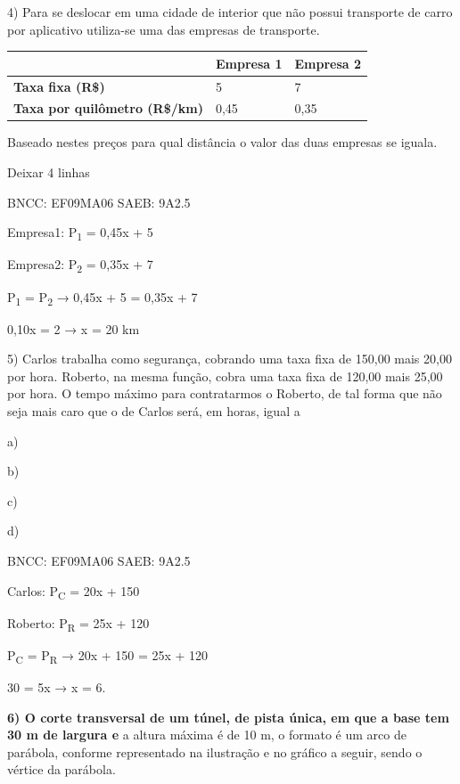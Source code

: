 \begin{escolha}
{{{\begin{escolha}
{4) Para se deslocar em uma cidade de interior que não possui transporte
de carro por aplicativo utiliza-se uma das empresas de transporte.

\begin{longtable}[]{@{}lll@{}}
\toprule\noalign{}
& \textbf{Empresa 1} & \textbf{Empresa 2} \\
\midrule\noalign{}
\endhead
\bottomrule\noalign{}
\endlastfoot
\textbf{Taxa fixa (R\$)} & 5 & 7 \\
\textbf{Taxa por quilômetro (R\$/km)} & 0,45 & 0,35 \\
\end{longtable}

Baseado nestes preços para qual distância o valor das duas empresas se
iguala.

Deixar 4 linhas

BNCC: EF09MA06 SAEB: 9A2.5

Empresa1: P\textsubscript{1} = 0,45x + 5

Empresa2: P\textsubscript{2} = 0,35x + 7

P\textsubscript{1} = P\textsubscript{2} → 0,45x + 5 = 0,35x + 7

0,10x = 2 → x = 20 km

5) Carlos trabalha como segurança, cobrando uma taxa fixa de 150,00 mais
20,00 por hora. Roberto, na mesma função, cobra uma taxa fixa de 120,00
mais 25,00 por hora. O tempo máximo para contratarmos o Roberto, de tal
forma que não seja mais caro que o de Carlos será, em horas, igual a

a)

b)

c)

d)

BNCC: EF09MA06 SAEB: 9A2.5

Carlos: P\textsubscript{C} = 20x + 150

Roberto: P\textsubscript{R} = 25x + 120

P\textsubscript{C} = P\textsubscript{R} → 20x + 150 = 25x + 120

30 = 5x → x = 6.

\textbf{6) O corte transversal de um túnel, de pista única, em que a
base tem 30 m de largura e} a altura máxima é de 10 m, o formato é um
arco de parábola, conforme representado na ilustração e no gráfico a
seguir, sendo o vértice da parábola.

}
\end{escolha}}}}
\end{escolha}
